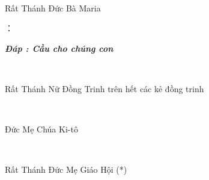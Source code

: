 \documentclass[12pt]{article}
\begin{document}
\begin{paracol}{2}
\begin{leftcolumn*}
\Large{\ \ \ }\\
\end{leftcolumn*}

\begin{rightcolumn}
Rất Thánh Đức Bà Maria\\
\end{rightcolumn}

\begin{leftcolumn*}
\Large{：\ \ \ \ }\\
\end{leftcolumn*}

\begin{rightcolumn}
\textit{\textbf{Đáp : Cầu cho chúng con}}\\
\end{rightcolumn}


\begin{leftcolumn*}
\Large{\ \ \ \ \ \ }\\
\end{leftcolumn*}

\begin{rightcolumn}
Rất Thánh Nữ Đồng Trinh trên hết các kẻ đồng trinh\\
\end{rightcolumn}

\begin{leftcolumn*}
\Large{\ \ \ \ \ }\\
\end{leftcolumn*}

\begin{rightcolumn}
Đức Mẹ Chúa Ki-tô\\
\end{rightcolumn}

\begin{leftcolumn*}
\Large{\ \ \ \ }\\ 
\end{leftcolumn*}

\begin{rightcolumn}
Rất Thánh Đức Mẹ Giáo Hội (*)\\
\end{rightcolumn}


\end{paracol}
\end{document}
